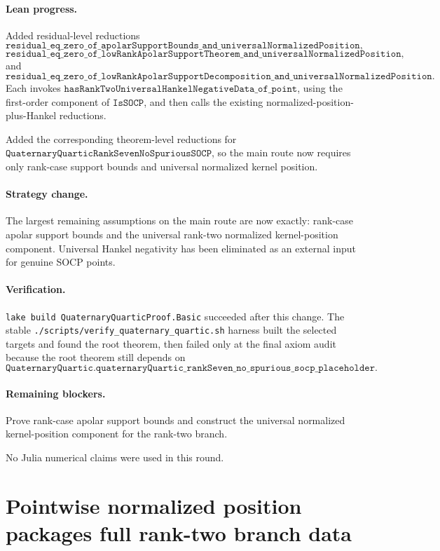 \documentclass[11pt]{article}
\begin{document}
\paragraph{Lean progress.}
Added residual-level reductions
\[
\texttt{residual\_eq\_zero\_of\_apolarSupportBounds\_and\_universalNormalizedPosition},
\]
\[
\texttt{residual\_eq\_zero\_of\_lowRankApolarSupportTheorem\_and\_universalNormalizedPosition},
\]
and
\[
\texttt{residual\_eq\_zero\_of\_lowRankApolarSupportDecomposition\_and\_universalNormalizedPosition}.
\]
Each invokes
\(\texttt{hasRankTwoUniversalHankelNegativeData\_of\_point}\), using the
first-order component of \(\texttt{IsSOCP}\), and then calls the existing
normalized-position-plus-Hankel reductions.

Added the corresponding theorem-level reductions for
\(\texttt{QuaternaryQuarticRankSevenNoSpuriousSOCP}\), so the main route now
requires only rank-case support bounds and universal normalized kernel position.

\paragraph{Strategy change.}
The largest remaining assumptions on the main route are now exactly:
rank-case apolar support bounds and the universal rank-two normalized
kernel-position component.  Universal Hankel negativity has been eliminated as
an external input for genuine SOCP points.

\paragraph{Verification.}
\texttt{lake build QuaternaryQuarticProof.Basic} succeeded after this change.
The stable \texttt{./scripts/verify\_quaternary\_quartic.sh} harness built the
selected targets and found the root theorem, then failed only at the final axiom
audit because the root theorem still depends on
\[
\texttt{QuaternaryQuartic.quaternaryQuartic\_rankSeven\_no\_spurious\_socp\_placeholder}.
\]

\paragraph{Remaining blockers.}
Prove rank-case apolar support bounds and construct the universal normalized
kernel-position component for the rank-two branch.

No Julia numerical claims were used in this round.

\section*{Pointwise normalized position packages full rank-two branch data}
\end{document}
